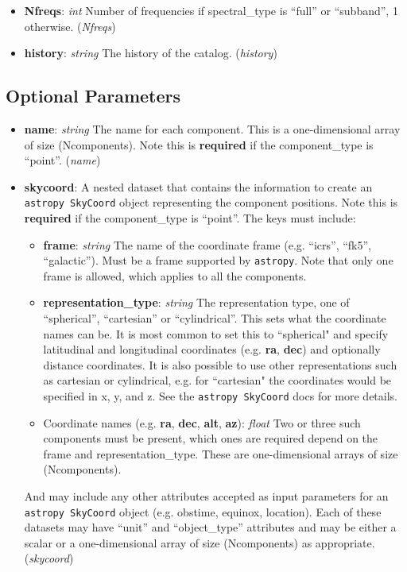 \documentclass[11pt, oneside]{article}
\begin{document}
\begin{itemize}
\item \textbf{Nfreqs}: \textit{int}
Number of frequencies if spectral\_type is ``full'' or ``subband'', 1 otherwise.
(\textit{Nfreqs})

\item \textbf{history}: \textit{string} The history of the catalog. (\textit{history})
\end{itemize}


\subsection{Optional Parameters}
\label{sec:opt_params}
\begin{itemize}
\item \textbf{name}: \textit{string} The name for each component. This is a
one-dimensional array of size (Ncomponents).
Note this is \textbf{required} if the component\_type is ``point''. (\textit{name})

\item \textbf{skycoord}:
A nested dataset that contains the information to create an \texttt{astropy SkyCoord}
object representing the component positions. Note this is \textbf{required} if the
component\_type is ``point''. The keys must include:
	\begin{itemize}
	\item \textbf{frame}: \textit{string} The name of the coordinate frame
	(e.g. ``icrs'', ``fk5'', ``galactic''). Must be a frame supported by \texttt{astropy}.
	Note that only one frame is allowed, which applies to all the components.
	\item \textbf{representation\_type}: \textit{string} The representation type, one
	of ``spherical'', ``cartesian'' or ``cylindrical''. This sets what the coordinate
	names can be. It is most common to set this to ``spherical" and
	specify latitudinal and longitudinal coordinates (e.g. \textbf{ra}, \textbf{dec})
	and optionally distance coordinates. It is also possible to use other
	representations such as cartesian or cylindrical, e.g. for ``cartesian" the
	coordinates would be specified in x, y, and z. See the \texttt{astropy SkyCoord}
	docs for more details.
	\item Coordinate names (e.g. \textbf{ra}, \textbf{dec}, \textbf{alt}, \textbf{az}):
	\textit{float} Two or three such components must be present, which ones are
	required depend on the frame and representation\_type. These are
	one-dimensional arrays of size (Ncomponents).
	\end{itemize}
And may include any other attributes accepted as input parameters for an
\texttt{astropy SkyCoord} object (e.g. obstime, equinox, location).
Each of these datasets may have ``unit'' and ``object\_type'' attributes and may
be either a scalar or a one-dimensional array of size (Ncomponents) as
appropriate.
(\textit{skycoord})


\end{itemize}
\end{document}
